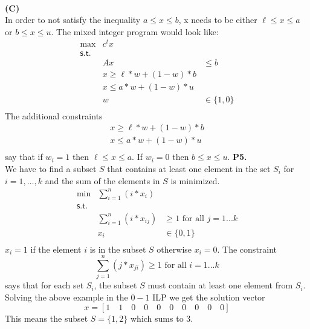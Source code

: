 \documentclass[11pt]{article}
\begin{document}
\\
\noindent\textbf{(C)}
\\
In order to not satisfy the inequality $a \leq x \leq b$, x needs to be either $\ell \leq x \leq a$ or $b \leq x \leq u$.  The mixed integer program would look like:
\[\begin{array}{rlllllllll}
\max & c^{t}x \\
\mathsf{s.t. } \\
& Ax & \leq b \\
& x \geq \ell*w+(1-w)*b \\
& x \leq a*w+(1-w)*u \\
& w & \in \{1,0\} \\
\end{array}\]
The additional constraints
\begin{align*}
x \geq \ell*w+(1-w)*b \\
x \leq a*w+(1-w)*u \\
\end{align*}
say that if $w_i = 1$ then $\ell \leq x \leq a$.  If $w_i = 0$ then $b \leq x \leq u$.
\newpage
\noindent\textbf{P5.}
\\
We have to find a subset $S$ that contains at least one element in the set $S_i$ for $i = 1,\ldots, k$ and the sum of the elements in $S$ is minimized.
\[\begin{array}{rlllllllll}
\min & \sum_{i=1}^{n} (i*x_i) \\
\mathsf{s.t. } \\
& \sum_{i=1}^{n} (i*x_{ij}) & \geq 1 \text{ for all }j = 1...k\\
& x_i & \in \{0,1\} \\
\end{array}\]
$x_i = 1$ if the element $i$ is in the subset $S$ otherwise $x_i = 0$.  The constraint 
$$
\sum_{j=1}^{n} (j*x_{ji}) \geq 1 \text{ for all }i = 1...k
$$
says that for each set $S_i$, the subset $S$ must contain at least one element from $S_i$.  Solving the above example in the $0-1$ ILP we get the solution vector 
$$
x = [1\quad1\quad0\quad0\quad0\quad0\quad0\quad0\quad0\quad0]
$$ 
This means the subset $S = \{1, 2\}$ which sums to 3.
\end{document}
